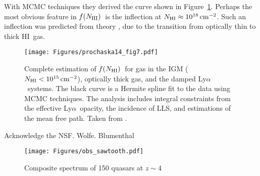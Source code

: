 \documentclass[graybox]{svmult}
\newcommand{\HI}{H{\sc I}}
\def\lya{Ly$\alpha$}
\newcommand{\mnhi}{N_{\rm HI}}
\def\cm#1{\, {\rm cm^{#1}}}
\def\mfnhi{f(\mnhi)}
\def\fnhi{$\mfnhi$}
\begin{document}
With MCMC techniques they derived the curve shown
in Figure~\ref{fig:full_fN}.
Perhaps the most obvious feature in \fnhi\ is the inflection
at $\mnhi \approx 10^{18} \cm{-2}$.
Such an inflection was predicted from theory \cite[]{zheng02,altay11},
due to the transition from optically thin to thick \HI\ gas.


%
\begin{figure}[b]
\sidecaption
\texttt{[image: Figures/prochaska14\_fig7.pdf]}
%
%
\caption{Complete estimation of \fnhi\ for gas in the
IGM ($\mnhi < 10^{15} \cm{-2}$), optically thick gas, and
the damped \lya\ systems.  The black curve is a Hermite spline
fit to the data using MCMC techniques.  The analysis includes
integral constraints from the effective \lya\ opacity,
the incidence of LLS, and estimations of the mean free path.
Taken from \cite{pro+14}.
}
\label{fig:full_fN}       %
\end{figure}


%
\begin{acknowledgement}
Acknowledge the NSF.  Wolfe.  Blumenthal
\end{acknowledgement}
%
%
%


%
\begin{figure}[b]
\sidecaption
\texttt{[image: Figures/obs\_sawtooth.pdf]}
%
%
\caption{Composite spectrum of 150 quasars at $z \sim 4$
}
\label{fig:stack_saw}       %
\end{figure}


%


\end{document}
